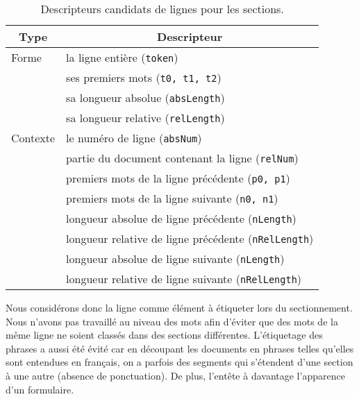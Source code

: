 \begin{table}[!htb]
	\centering
	\begin{tabular}{|l|l|}
		\hline
		\multicolumn{1}{|c}{Type} & \multicolumn{1}{|c|}{Descripteur} \\ \hline
		Forme & \tabitem la ligne entière (\verb|token|)  \\  
		& \tabitem ses premiers mots (\verb|t0, t1, t2|) \\
		& \tabitem sa longueur absolue (\verb|absLength|) \\ 
		& \tabitem sa longueur relative (\verb|relLength|) \\ \hline
		Contexte & \tabitem le numéro de ligne (\verb|absNum|) \\
		& \tabitem partie du document contenant la ligne (\verb|relNum|) \\
		& \tabitem premiers mots de la ligne précédente (\verb|p0, p1|) \\ 
		& \tabitem premiers mots de la ligne suivante (\verb|n0, n1|) \\
		& \tabitem longueur absolue de ligne précédente (\verb|nLength|) \\  
		& \tabitem longueur relative de ligne précédente (\verb|nRelLength|) \\
		& \tabitem longueur absolue de ligne suivante (\verb|nLength|) \\  
		& \tabitem longueur relative de ligne suivante (\verb|nRelLength|) \\ \hline
	\end{tabular}
	\caption{Descripteurs candidats de lignes pour les sections.} \label{tab:structuration:descripteursligne}
\end{table}

Nous considérons donc la ligne comme élément à étiqueter lors du sectionnement. Nous n'avons pas travaillé au niveau des mots afin d'éviter que des mots de la même ligne ne soient classés dans des sections différentes. L'étiquetage des phrases a aussi été évité car en découpant les documents en phrases telles qu'elles sont entendues en français, on a parfois des segments qui s'étendent d'une section à une autre (absence de ponctuation). De plus, l'entête à davantage l'apparence d'un formulaire.

